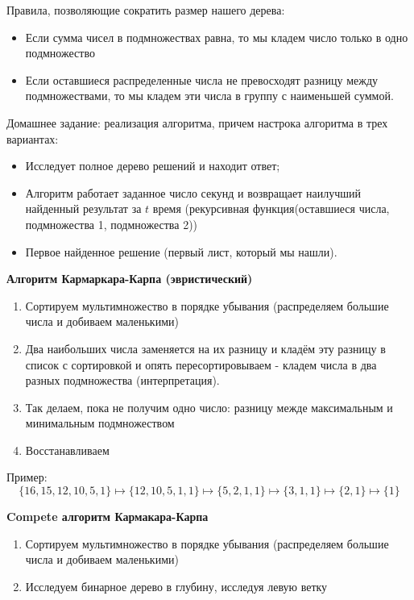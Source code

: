 \documentclass[%
10pt, %
final, %
oneside, %
onecolumn, %
centertags]{article} %
\theoremstyle{plain}
\theoremstyle{definition}
\theoremstyle{remark}
\begin{document}
Правила, позволяющие сократить размер нашего дерева:

\begin{itemize}
	\item Если сумма чисел в подмножествах равна, то мы кладем число только в одно подмножество
	\item Если оставшиеся распределенные числа не превосходят разницу между подмножествами, то мы кладем эти числа в группу с наименьшей суммой.
\end{itemize}

Домашнее задание: реализация алгоритма, причем настрока алгоритма в трех вариантах:
\begin{itemize}
	\item Исследует полное дерево решений и находит ответ;
	\item Алгоритм работает заданное число секунд и возвращает наилучший найденный результат за $t$ время (рекурсивная функция(оставшиеся числа, подмножества 1, подмножества 2))
	\item Первое найденное решение (первый лист, который мы нашли).
\end{itemize}

\textbf{Алгоритм Кармаркара-Карпа (эвристический)}

\begin{enumerate}
	\item Сортируем мультимножество в порядке убывания (распределяем большие числа и добиваем маленькими)
	\item Два наибольших числа заменяется на их разницу и кладём эту разницу в список с сортировкой и опять пересортировываем - кладем числа в два разных подмножества (интерпретация).

	\item Так делаем, пока не получим одно число: разницу межде максимальным и минимальным подмножеством
	\item Восстанавливаем
\end{enumerate}

Пример:
$$\{16,15,12,10,5,1\} \mapsto \{12,10,5,1,1\} \mapsto \{5,2,1,1\} \mapsto \{3,1,1\} \mapsto \{2,1\} \mapsto \{1\}$$

\textbf{Compete алгоритм Кармакара-Карпа}

\begin{enumerate}
	\item Сортируем мультимножество в порядке убывания (распределяем большие числа и добиваем маленькими)
	\item Исследуем бинарное дерево в глубину, исследуя левую ветку
\end{enumerate}
\end{document}
